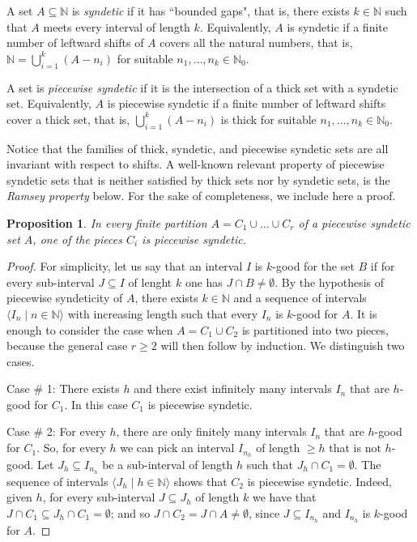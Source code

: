 \documentclass[10pt]{amsart}
\newtheorem{proposition}[theorem]{Proposition}
\theoremstyle{definition}
\theoremstyle{remark}
\def\N{\mathbb{N}}
\begin{document}
A set $A\subseteq\N$ is \emph{syndetic} if it has ``bounded gaps",
that is, there exists $k\in\N$ such that $A$ meets every
interval of length $k$. Equivalently, $A$ is syndetic if
a finite number of leftward shifts of $A$ covers all the natural numbers,
that is, $\N=\bigcup_{i=1}^k(A-n_i)$ for suitable $n_1,\ldots,n_k\in\N_0$.

A set is \emph{piecewise syndetic} if it is the intersection of a thick set with
a syndetic set. Equivalently, $A$ is piecewise syndetic
if a finite number of leftward shifts cover a thick set, that is,
$\bigcup_{i=1}^k(A-n_i)$ is thick for suitable $n_1,\ldots,n_k\in\N_0$.

Notice that the families of thick, syndetic, and piecewise syndetic sets
are all invariant with respect to shifts.
A well-known relevant property of piecewise syndetic sets that is neither satisfied
by thick sets nor by syndetic sets, is the \emph{Ramsey property} below.
For the sake of completeness, we include here a proof.

\begin{proposition}\label{psRamsey} 
In every finite partition $A=C_1\cup\ldots\cup C_r$ of a piecewise
syndetic set $A$, one of the pieces $C_i$ is piecewise syndetic.
\end{proposition}

\begin{proof}
For simplicity, let us say that an interval $I$ is $k$-good for the set $B$
if for every sub-interval $J\subseteq I$ of lenght $k$ one has $J\cap B\ne\emptyset$.
By the hypothesis of piecewise syndeticity of $A$,
there exists $k\in\N$ and a sequence of
intervals $\langle I_n\mid n\in\N\rangle$ with
increasing length such that every $I_n$ is $k$-good for $A$.
It is enough to consider the case when $A=C_1\cup C_2$ is partitioned into two pieces,
because the general case $r\ge 2$ will then follow by induction.
We distinguish two cases. 

Case \# 1: There exists $h$ and there exist
infinitely many intervals $I_n$ that are $h$-good for $C_1$.
In this case $C_1$ is piecewise syndetic.

Case \# 2: For every $h$, there are only finitely many intervals $I_n$ that
are $h$-good for $C_1$. So, for every $h$ we can pick an interval 
$I_{n_h}$ of length $\ge h$ that is not $h$-good.
Let $J_h\subseteq I_{n_h}$ be a sub-interval of length $h$ such
that $J_h\cap C_1=\emptyset$.
The sequence of intervals $\langle J_h\mid h\in\N\rangle$ shows
that $C_2$ is piecewise syndetic.
Indeed, given $h$, for every sub-interval $J\subseteq J_h$ of length $k$
we have that $J\cap C_1\subseteq J_h\cap C_1=\emptyset$; and so
$J\cap C_2=J\cap A\ne\emptyset$, since $J\subseteq I_{n_h}$
and $I_{n_h}$ is $k$-good for $A$.
\end{proof}
\end{document}
